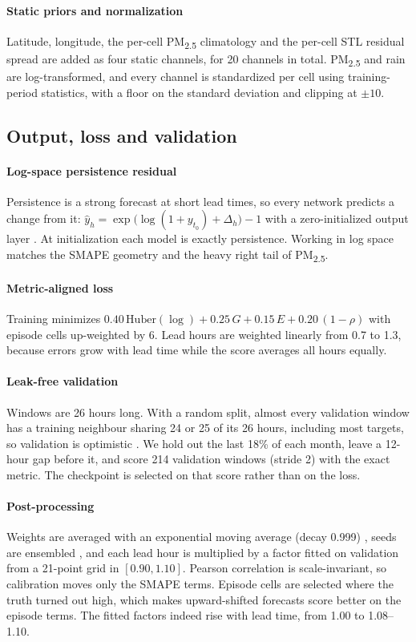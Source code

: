 \documentclass[10pt]{article}
\newcommand{\PM}{PM\textsubscript{2.5}}
\begin{document}
\paragraph{Static priors and normalization}
Latitude, longitude, the per-cell \PM{} climatology and the per-cell STL residual spread are added as four static channels, for 20 channels in total. \PM{} and rain are log-transformed, and every channel is standardized per cell using training-period statistics, with a floor on the standard deviation and clipping at $\pm10$.

\subsection{Output, loss and validation}

\paragraph{Log-space persistence residual}
Persistence is a strong forecast at short lead times, so every network predicts a change from it: $\hat y_h=\exp\!\big(\log(1+y_{t_0})+\Delta_h\big)-1$ with a zero-initialized output layer \citep{he2016}. At initialization each model is exactly persistence. Working in log space matches the SMAPE geometry and the heavy right tail of \PM.

\paragraph{Metric-aligned loss}
Training minimizes $0.40\,\mathrm{Huber}(\log)+0.25\,G+0.15\,E+0.20\,(1-\rho)$ with episode cells up-weighted by 6. Lead hours are weighted linearly from 0.7 to 1.3, because errors grow with lead time while the score averages all hours equally.

\paragraph{Leak-free validation}
Windows are 26 hours long. With a random split, almost every validation window has a training neighbour sharing 24 or 25 of its 26 hours, including most targets, so validation is optimistic \citep{roberts2017}. We hold out the last 18\% of each month, leave a 12-hour gap before it, and score 214 validation windows (stride 2) with the exact metric. The checkpoint is selected on that score rather than on the loss.

\paragraph{Post-processing}
Weights are averaged with an exponential moving average (decay 0.999) \citep{polyak1992}, seeds are ensembled \citep{lakshminarayanan2017}, and each lead hour is multiplied by a factor fitted on validation from a 21-point grid in $[0.90,1.10]$. Pearson correlation is scale-invariant, so calibration moves only the SMAPE terms. Episode cells are selected where the truth turned out high, which makes upward-shifted forecasts score better on the episode terms. The fitted factors indeed rise with lead time, from 1.00 to 1.08--1.10.
\end{document}
